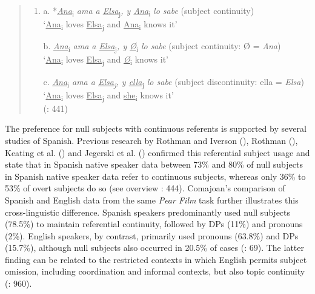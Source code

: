 \documentclass[
  letterpaper,
  DIV=11,
  numbers=noendperiod]{scrartcl}
\begin{document}
\begin{quote}
\begin{enumerate}
\def\labelenumi{\arabic{enumi}.}
\setcounter{enumi}{14}
\item
  a. *\ul{\emph{Ana}}\textsubscript{i} \emph{ama a
  \ul{Elsa}}\textsubscript{j}\emph{, y \ul{Ana}}\textsubscript{i}
  \emph{lo sabe} (subject continuity)\\
  `\ul{Ana}\textsubscript{i} loves \ul{Elsa}\textsubscript{j} and
  \ul{Ana}\textsubscript{i} knows it'

  b. \ul{\emph{Ana}}\textsubscript{i} \emph{ama a
  \ul{Elsa}}\textsubscript{j}\emph{, y \ul{Ø}}\textsubscript{i} \emph{lo
  sabe} (subject continuity: Ø = \emph{Ana})\\
  `\ul{Ana}\textsubscript{i} loves \ul{Elsa}\textsubscript{j} and
  \ul{\emph{Ø}}\textsubscript{i} knows it'

  c. \ul{\emph{Ana}}\textsubscript{i} \emph{ama a
  \ul{Elsa}\textsubscript{j}, y \ul{ella}}\textsubscript{j} \emph{lo
  sabe} (subject discontinuity: ella = \emph{Elsa})\\
  `\ul{Ana}\textsubscript{i} loves \ul{Elsa}\textsubscript{j} and
  \ul{she}\textsubscript{i} knows it'\\
  (: 441)
\end{enumerate}
\end{quote}

The preference for null subjects with continuous referents is supported
by several studies of Spanish. Previous research by Rothman and Iverson
(), Rothman
(), Keating et al.
() and Jegerski et al.
() confirmed this referential subject
usage and state that in Spanish native speaker data between 73\% and
80\% of null subjects in Spanish native speaker data refer to continuous
subjects, whereas only 36\% to 53\% of overt subjects do so (see
overview : 444). Comajoan's comparison of Spanish and English data
from the same \emph{Pear Film} task further illustrates this
cross-linguistic difference. Spanish speakers predominantly used null
subjects (78.5\%) to maintain referential continuity, followed by DPs
(11\%) and pronouns (2\%). English speakers, by contrast, primarily used
pronouns (63.8\%) and DPs (15.7\%), although null subjects also occurred
in 20.5\% of cases (: 69).
The latter finding can be related to the restricted contexts in which
English permits subject omission, including coordination and informal
contexts, but also topic continuity (: 960).
\end{document}
